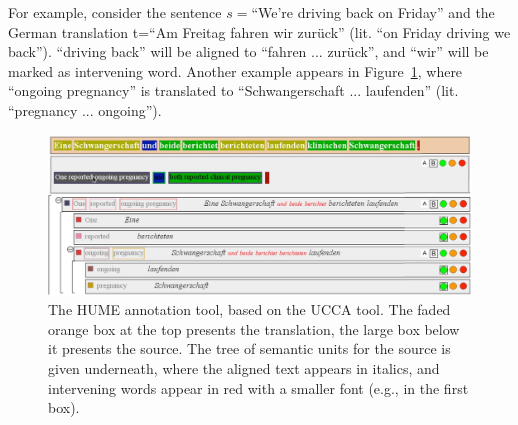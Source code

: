 \documentclass[11pt]{article}
\newcommand{\figref}[1]{Figure~\ref{#1}}
\newcommand{\bh}[1]{\footnote{\color{blue}BH: #1}}
\begin{document}
For example, consider the sentence $s=$``We're driving back on Friday'' and the German
translation t=``Am Freitag fahren wir zur\"uck'' (lit. ``on Friday driving we back'').
``driving back'' will be aligned to ``fahren ... zur\"uck'',
and ``wir'' will be marked as intervening word. Another example
appears in \figref{fig:interface}, where ``ongoing pregnancy'' is translated to
``Schwangerschaft ... laufenden'' (lit. ``pregnancy ... ongoing'').






\begin{figure}[t]
    \begin{center}
    \includegraphics[width=1\textwidth]{hume_interface2.jpg}
    \caption{The HUME annotation tool, based on the UCCA tool. The faded orange box at the top
      presents the translation, the large box below it presents the source. The tree of semantic units
      for the source is given underneath, where the aligned text appears in italics, and intervening words
      appear in red with a smaller font (e.g., in the first box).}
    \label{fig:interface}
    \end{center}
\end{figure}
\end{document}
